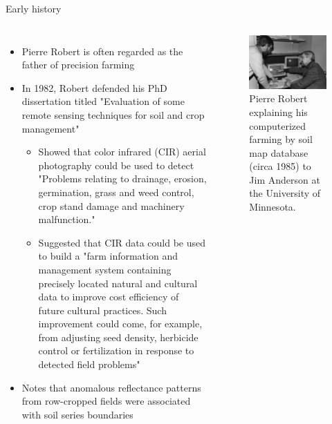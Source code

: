 \documentclass[11pt,dvipsnames,ignorenonframetext,aspectratio=169]{beamer}
\begin{document}
\begin{frame}{Early history}
\protect\hypertarget{early-history}{}
\begin{columns}[T, onlytextwidth]


\begin{itemize}
\small
\item Pierre Robert is often regarded as the father of precision farming
\item In 1982, Robert defended his PhD dissertation titled "Evaluation of some remote sensing techniques for soil and crop management"
  \begin{itemize}
  \footnotesize
  \item Showed that color infrared (CIR) aerial photography could be used to detect "Problems relating to drainage, erosion, germination, grass and weed control, crop stand damage and machinery malfunction."
  \item Suggested that CIR data could be used to build a "farm information and management system containing precisely located natural and cultural data to improve cost efficiency of future cultural practices. Such improvement could come, for example, from adjusting seed density, herbicide control or fertilization in response to detected field problems"
  \end{itemize}
\item Notes that anomalous reflectance patterns from row-cropped fields were associated with soil series boundaries
\end{itemize}


\begin{figure}
\includegraphics[width=0.99\linewidth]{../images/pierre-robert-in-development} \caption{Pierre Robert explaining his computerized farming by soil map database (circa 1985) to Jim Anderson at the University of Minnesota.}\label{fig:pierre-robers-computerized-farming}
\end{figure}

\end{columns}
\end{frame}
\end{document}
